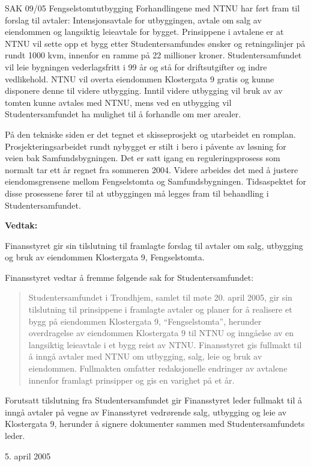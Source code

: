 \begin{instruksledd}{SAK 09/05 Fengselstomtutbygging}
    Forhandlingene med NTNU har ført fram til forslag til avtaler: Intensjonsavtale for
    utbyggingen, avtale om salg av
    eiendommen og langsiktig leieavtale for bygget. Prinsippene i avtalene er at NTNU vil
    sette opp et bygg etter
    Studentersamfundes ønsker og retningslinjer på rundt 1000 kvm, innenfor en ramme på 22
    millioner kroner.
    Studentersamfundet vil leie bygningen vederlagsfritt i 99 år og stå for driftsutgifter
    og indre vedlikehold. NTNU vil
    overta eiendommen Klostergata 9 gratis og kunne disponere denne til videre utbygging.
    Inntil videre utbygging vil
    bruk av av tomten kunne avtales med NTNU, mens ved en utbygging vil Studentersamfundet
    ha mulighet til å
    forhandle om mer arealer.

    På den tekniske siden er det tegnet et skisseprosjekt og utarbeidet en romplan.
    Prosjekteringsarbeidet rundt nybygget
    er stilt i bero i påvente av løsning for veien bak Samfundsbygningen. Det er satt
    igang en reguleringsprosess som
    normalt tar ett år regnet fra sommeren 2004. Videre arbeides det med å justere
    eiendomsgrensene mellom
    Fengselstomta og Samfundsbygningen. Tidsaspektet for disse prosessene fører til at
    utbyggingen må legges fram til
    behandling i Studentersamfundet.

    \textbf{Vedtak:}

    Finansstyret gir sin tilslutning til framlagte forslag til avtaler om salg, utbygging
    og bruk av eiendommen Klostergata
    9, Fengselstomta.

    Finansstyret vedtar å fremme følgende sak for Studentersamfundet: 
    \begin{quote}
        Studentersamfundet i Trondhjem, samlet til møte
        20. april 2005, gir sin tilslutning til prinsippene i framlagte avtaler og planer for
        å realisere et bygg på eiendommen
        Klostergata 9, ``Fengselstomta'', herunder overdragelse av eiendommen Klostergata 9 til
        NTNU og inngåelse av en
        langsiktig leieavtale i et bygg reist av NTNU. Finansstyret gis fullmakt til å inngå
        avtaler med NTNU om utbygging,
        salg, leie og bruk av eiendommen. Fullmakten omfatter redaksjonelle endringer av
        avtalene innenfor framlagt
        prinsipper og gis en varighet på et år.
    \end{quote}

    Forutsatt tilslutning fra Studentersamfundet gir Finansstyret leder fullmakt til å
    inngå avtaler på vegne av Finansstyret
    vedrørende salg, utbygging og leie av Klostergata 9, herunder å signere dokumenter
    sammen med Studentersamfundets leder.
    
    5. april 2005

\end{instruksledd}


